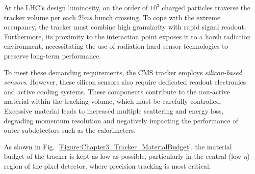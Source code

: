 At the \ac{LHC}’s design luminosity, on the order of $10^3$ charged particles traverse the tracker volume per each $25\unit{ns}$ bunch crossing. To cope with the extreme occupancy, the tracker must combine high granularity with rapid signal readout. Furthermore, its proximity to the interaction point exposes it to a harsh radiation environment, necessitating the use of radiation-hard sensor technologies to preserve long-term performance.

To meet these demanding requirements, the \ac{CMS} tracker employs \textit{silicon-based sensors}. However, these silicon sensors also require dedicated readout electronics and active cooling systems. These components contribute to the non-active material within the tracking volume, which must be carefully controlled. Excessive material leads to increased multiple scattering and energy loss, degrading momentum resolution and negatively impacting the performance of outer subdetectors such as the calorimeters.

As shown in Fig.~\ref{Figure:Chapter3_Tracker_MaterialBudget}, the material budget of the tracker is kept as low as possible, particularly in the central (low-$\eta$) region of the pixel detector, where precision tracking is most critical.


